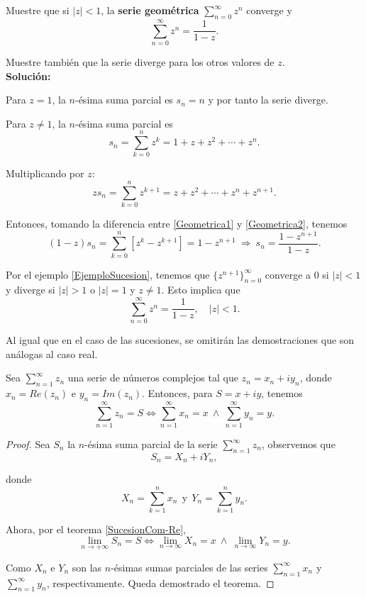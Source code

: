 \begin{ejemplo} \label{SerieGeo}
Muestre que si $|z| < 1$, la \textbf{serie geométrica} $\sum\limits_{n=0}^{\infty} z^n$ converge y
$$\sum_{n=0}^{\infty} z^n = \frac{1}{1-z}.$$

Muestre también que la serie diverge para los otros valores de $z$.
\\

\textbf{Solución:} 

Para $z=1$, la $n$-ésima suma parcial es $s_n = n$ y por tanto la serie diverge.

Para $z\neq 1$, la $n$-ésima suma parcial es
\begin{equation}
    s_n = \sum_{k=0}^n z^k = 1 + z +z^2 + \cdots + z^n. \label{Geometrica1}
\end{equation}

Multiplicando por $z$:
\begin{equation}
    z s_n = \sum_{k=0}^n z^{k+1} = z + z^2  + \cdots + z^n + z^{n+1}. \label{Geometrica2}
\end{equation}

Entonces, tomando la diferencia entre \eqref{Geometrica1} y \eqref{Geometrica2}, tenemos
$$(1-z) s_n = \sum_{k=0}^n [z^k - z^{k+1}] = 1 - z^{n+1} ~\Rightarrow~ s_n = \frac{1-z^{n+1}}{1-z}.$$

Por el ejemplo \ref{EjemploSucesion}, tenemos que $\{z^{n+1}\}_{n=0}^{\infty}$ converge a 0 si $|z|<1$ y diverge si $|z| > 1$ o $|z|=1$ y $z \neq 1$. Esto implica que
$$\sum_{n=0}^{\infty} z^n = \frac{1}{1-z}, \quad |z| <1.$$
\end{ejemplo}
\newpage

Al igual que en el caso de las sucesiones, se omitirán las demostraciones que son análogas al caso real.

\begin{teorema} \label{SerieCom-Re}
Sea $\sum\limits_{n=1}^{\infty} z_n$ una serie de números complejos tal que $z_n = x_n + iy_n$, donde $x_n=Re(z_n)$ e $y_n = Im(z_n)$. Entonces, para $S = x + iy$, tenemos
$$\sum_{n=1}^{\infty} z_n = S \Leftrightarrow \sum_{n=1}^{\infty} x_n = x ~\wedge~ \sum_{n=1}^{\infty} y_n = y.$$
\end{teorema}

\begin{proof}
Sea $S_n$ la $n$-ésima suma parcial de la serie $\sum\limits_{n=1}^{\infty} z_n$, observemos que
$$S_n = X_n + i Y_n,$$

donde
$$X_n = \sum_{k=1}^n x_n ~~\mbox{y}~~ Y_n = \sum_{k=1}^n y_n.$$

Ahora, por el teorema \ref{SucesionCom-Re}, 
$$\lim_{n \to + \infty} S_n = S \Leftrightarrow \lim_{n \to \infty} X_n = x ~\wedge~ \lim_{n \to \infty} Y_n = y.$$

Como $X_n$ e $Y_n$ son las $n$-ésimas sumas parciales de las series $\sum\limits_{n=1}^{\infty} x_n$ y $\sum\limits_{n=1}^{\infty} y_n$, respectivamente. Queda demostrado el teorema.

\end{proof}

